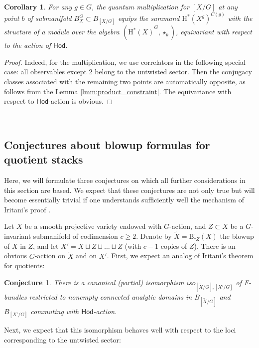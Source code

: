 \documentclass[12pt,a4paper]{amsart}
\newtheorem{corollary}[theorem]{Corollary}
\newtheorem{conjecture}[theorem]{Conjecture}
\theoremstyle{definition}
\theoremstyle{remark}
\begin{document}
\begin{corollary} For any $g\in G$,  the quantum multiplication for $[X/G]$ at any point $b$ of submanifold $B_X^G\subset B_{[X/G]}$ equips the summand $\mathrm{H}^\ast(X^g)^{C(g)}$ with the structure of a module over the algebra $({\mathrm H^\ast(X)}^{G},\star_b)$, equivariant with respect to the action of $\mathsf{Hod}$. \label{cor:module}
    \end{corollary}

\begin{proof}
    Indeed, for the multiplication, we use correlators in the following special case:  
 all observables except 2 belong to the untwisted sector. Then the conjugacy classes associated with the remaining two points are automatically opposite, as follows from the  Lemma \ref{lmm:product_constraint}. The equivariance with respect to $\mathsf{Hod}$-action is obvious.
\end{proof}

\ 

\subsection{Conjectures about blowup formulas for quotient stacks}

Here, we will formulate three conjectures on which all further considerations in this section are based. We expect that these conjectures are not only true but will become essentially trivial if one understands sufficiently well the mechanism of Iritani's proof \cite{iritani2023quantumcohomologyblowups}. 


Let $X$ be a smooth projective variety endowed with $G$-action, and $Z\subset X$ be a $G$-invariant submanifold of codimension $c\ge 2$.
 Denote by $\widetilde X= \mathrm{Bl}_Z(X)$  the blowup of $X$ in  $Z$, and  let $X' = X \sqcup Z \sqcup \ldots \sqcup Z$ (with $c-1$ copies of $Z$). There is an obvious $G$-action on $\widetilde X$ and on $X'$. First, we expect an analog of Iritani's theorem for quotients:

 \begin{conjecture}\label{conj:1} There is a canonical (partial) isomorphism $iso_{[\widetilde X/G],[X'/G]}$ of F-bundles restricted to nonempty connected analytic domains in $B_{[\widetilde X/G]}$ and $B_{[X'/G]}$ commuting with $\mathsf{Hod}$-action.
 \end{conjecture}

 
 Next, we expect that this isomorphism behaves well with respect to the loci corresponding to the untwisted sector:
\end{document}

